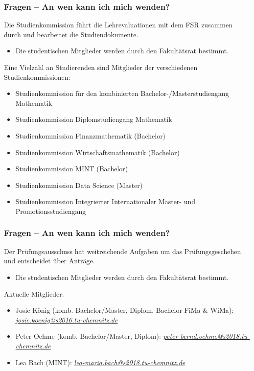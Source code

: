 \documentclass[10pt]{beamer}
\begin{document}
\begin{frame}
\frametitle{Fragen -- An wen kann ich mich wenden?}
\begin{block}{\vphantom{X}}
	Die Studienkommission führt die Lehrevaluationen mit dem FSR zusammen durch und bearbeitet die Studiendokumente.
\end{block}
\begin{itemize}
	\item Die studentischen Mitglieder werden durch den Fakultätsrat bestimmt.
\end{itemize}
Eine Vielzahl an Studierenden sind Mitglieder der verschiedenen Studienkommissionen:
\begin{itemize}
	\item Studienkommission für den kombinierten Bachelor-/Masterstudiengang Mathematik  
	\item Studienkommission Diplomstudiengang Mathematik  
	\item Studienkommission Finanzmathematik (Bachelor)
	\item Studienkommission Wirtschaftsmathematik (Bachelor)
	\item Studienkommission MINT (Bachelor)
	\item Studienkommission Data Science (Master)
	\item Studienkommission Integrierter Internationaler Master- und Promotionsstudiengang
\end{itemize}
\end{frame}

\begin{frame}
\frametitle{Fragen -- An wen kann ich mich wenden?}
\begin{block}{\vphantom{X}}
	Der Prüfungsausschuss hat weitreichende Aufgaben um das Prüfungsgeschehen und entscheidet über Anträge.
\end{block}
\begin{itemize}
	\item Die studentischen Mitglieder werden durch den Fakultätsrat bestimmt.
\end{itemize}
Aktuelle Mitglieder:
\begin{itemize}
	\item Josie König (komb. Bachelor/Master, Diplom, Bachelor FiMa \& WiMa): \textit{\href{mailto:josie.koenig@s2016.tu-chemnitz.de}{josie.koenig@s2016.tu-chemnitz.de}}
	\item Peter Oehme (komb. Bachelor/Master, Diplom): \textit{\href{mailto:peter-bernd.oehme@s2018.tu-chemnitz.de}{peter-bernd.oehme@s2018.tu-chemnitz.de}}
	\item Lea Bach (MINT): \textit{\href{mailto:lea-maria.bach@s2018.tu-chemnitz.de}{lea-maria.bach@s2018.tu-chemnitz.de}}
\end{itemize}
\end{frame}
\end{document}
